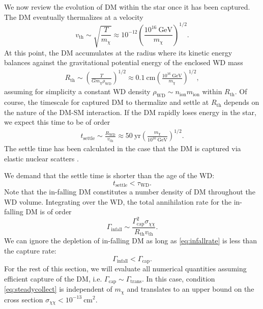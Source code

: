 \documentclass[preprintnumbers,amsmath,amssymb,prd,superscriptaddress]{revtex4}
\newcommand{\GeV}{\text{GeV}}
\newcommand{\cm}{\text{cm}}
\def\r{\right)}
\def\l{\left(}
\begin{document}
We now review the evolution of DM within the star once it has been captured. 
The DM eventually thermalizes at a velocity
\begin{equation}
v_\text{th} \sim \sqrt{\frac{T}{m_\chi}} \approx 10^{-12} \l \frac{10^{16} ~\GeV}{m_\chi}\r^{1/2}. 
\end{equation}
At this point, the DM accumulates at the radius where its kinetic energy balances against the gravitational potential energy of the enclosed WD mass
\begin{align}
R_\text{th} \sim \l \frac{T}{G m_\chi \rho_\text{WD}}\r^{1/2} \approx 0.1 ~\cm \l \frac{10^{16} ~\GeV}{m_\chi}\r^{1/2},
\end{align}
assuming for simplicity a constant WD density $\rho_\text{WD} \sim n_\text{ion} m_\text{ion}$ within $R_\text{th}$.
Of course, the timescale for captured DM to thermalize and settle at $R_\text{th}$ depends on the nature of the DM-SM interaction.
If the DM rapidly loses energy in the star, we expect this time to be of order
\begin{align}
\label{eq:tdrift}
  t_\text{settle} \sim \frac{R_\text{WD}}{v_\text{th}}
  \approx 50 ~\text{yr} \l \frac{m_\chi}{10^{16} ~\GeV} \r^{1/2}. 
\end{align}
The settle time has been calculated in the case that the DM is captured via elastic nuclear scatters \cite{Tinyakov}.
 
We demand that the settle time is shorter than the age of the WD:
\begin{equation}
t_\text{settle} < \tau_\text{WD}.
\end{equation}
Note that the in-falling DM constitutes a number density of DM throughout the WD volume.
Integrating over the WD, the total annihilation rate for the in-falling DM is of order
\begin{equation}
\label{eq:infallrate}
\Gamma_\text{infall} \sim \frac{\Gamma_\text{cap}^2 \sigma_{\chi \chi}}{R_\text{th} v_\text{th}}.
\end{equation}
We can ignore the depletion of in-falling DM as long as \eqref{eq:infallrate} is less than the capture rate:
\begin{equation}
\label{eq:steadycollect}
\Gamma_\text{infall} < \Gamma_\text{cap}.
\end{equation}
For the rest of this section, we will evaluate all numerical quantities assuming efficient capture of the DM, i.e. $\Gamma_\text{cap} \sim \Gamma_\text{trans}$. 
In this case, condition \eqref{eq:steadycollect} is independent of $m_\chi$ and translates to an upper bound on the cross section $\sigma_{\chi \chi} < 10^{-13} ~\text{cm}^2$. 
\end{document}
